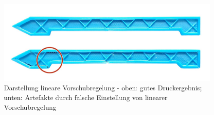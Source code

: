 \begin{figure}[h]
	\centering
	\includegraphics[width=0.8\linewidth]{bilder/img_linear-advance.jpeg}
        \caption[Darstellung lineare Vorschubregelung] {Darstellung lineare Vorschubregelung - oben: gutes Druckergebnis; unten: Artefakte durch falsche Einstellung von linearer Vorschubregelung \autocite{prusaLinearAdvance}}
	\label{fig:linearadvance}
\end{figure}